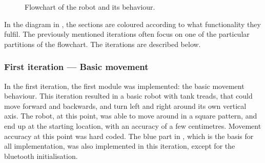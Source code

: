 \begin{figure}[H]
     \caption{\label{fig:CompleteRobotFlowchart} Flowchart of the robot and its behaviour.}
\end{figure}

In the diagram in , the sections are coloured according to what functionality they fulfil. The previously mentioned iterations often focus on one of the particular partitions of the flowchart. The iterations are described below.


\subsubsection{First iteration --- Basic movement}
In the first iteration, the first module was implemented: the basic movement behaviour. This iteration resulted in a basic robot with tank treads, that could move forward and backwards, and turn left and right around its own vertical axis. The robot, at this point, was able to move around in a square pattern, and end up at the starting location, with an accuracy of a few centimetres. Movement accuracy at this point was hard coded. The blue part in , which is the basis for all implementation, was also implemented in this iteration, except for the bluetooth initialisation.


